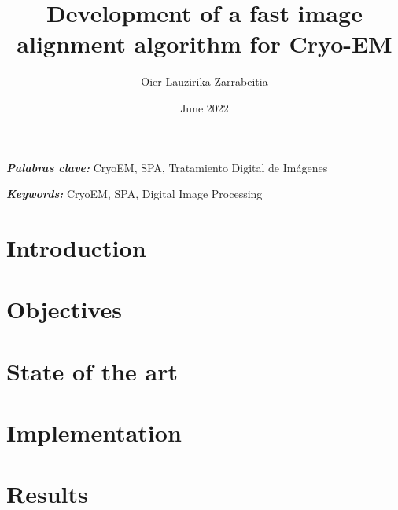 \documentclass{etsit-report}
\title{Development of a fast image alignment algorithm for Cryo-EM}
\author{Oier Lauzirika Zarrabeitia}
\date{June 2022}
\begin{document}
\frontmatter

\cleardoublepage
\makefrontpage

\cleardoublepage
\makeinfopage

\cleardoublepage
\maketitle

\begin{otherlanguage}{spanish}
\begin{abstract}
    
\end{abstract}
\textit{\textbf{Palabras clave:}}
CryoEM, SPA, Tratamiento Digital de Imágenes
\end{otherlanguage}

\begin{abstract}
    
\end{abstract}
\textit{\textbf{Keywords: }}
CryoEM, SPA, Digital Image Processing

\newpage
\tableofcontents
\listoffigures
\listoftables
\lstlistoflistings

\printglossary[type=\acronymtype]

\mainmatter

\chapter{Introduction}
\label{chap:introduction}


\chapter{Objectives}
\label{chap:objetives}


\chapter{State of the art}
\label{chap:state_of_the_art}


\chapter{Implementation}
\label{chap:implementation}


\chapter{Results}
\label{chap:results}

\end{document}
